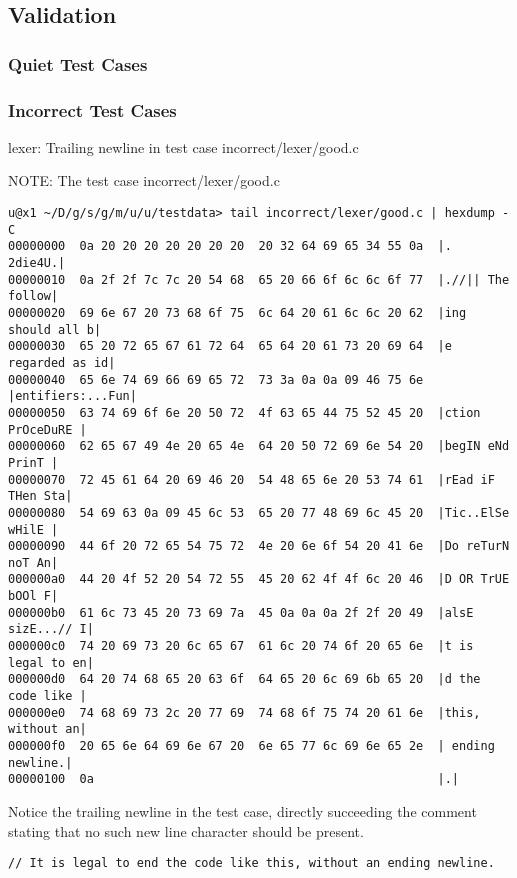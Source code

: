 \subsection{Validation}


\subsubsection{Quiet Test Cases}



\subsubsection{Incorrect Test Cases}

lexer: Trailing newline in test case incorrect/lexer/good.c


NOTE: The test case incorrect/lexer/good.c

\begin{verbatim}
u@x1 ~/D/g/s/g/m/u/u/testdata> tail incorrect/lexer/good.c | hexdump -C
00000000  0a 20 20 20 20 20 20 20  20 32 64 69 65 34 55 0a  |.        2die4U.|
00000010  0a 2f 2f 7c 7c 20 54 68  65 20 66 6f 6c 6c 6f 77  |.//|| The follow|
00000020  69 6e 67 20 73 68 6f 75  6c 64 20 61 6c 6c 20 62  |ing should all b|
00000030  65 20 72 65 67 61 72 64  65 64 20 61 73 20 69 64  |e regarded as id|
00000040  65 6e 74 69 66 69 65 72  73 3a 0a 0a 09 46 75 6e  |entifiers:...Fun|
00000050  63 74 69 6f 6e 20 50 72  4f 63 65 44 75 52 45 20  |ction PrOceDuRE |
00000060  62 65 67 49 4e 20 65 4e  64 20 50 72 69 6e 54 20  |begIN eNd PrinT |
00000070  72 45 61 64 20 69 46 20  54 48 65 6e 20 53 74 61  |rEad iF THen Sta|
00000080  54 69 63 0a 09 45 6c 53  65 20 77 48 69 6c 45 20  |Tic..ElSe wHilE |
00000090  44 6f 20 72 65 54 75 72  4e 20 6e 6f 54 20 41 6e  |Do reTurN noT An|
000000a0  44 20 4f 52 20 54 72 55  45 20 62 4f 4f 6c 20 46  |D OR TrUE bOOl F|
000000b0  61 6c 73 45 20 73 69 7a  45 0a 0a 0a 2f 2f 20 49  |alsE sizE...// I|
000000c0  74 20 69 73 20 6c 65 67  61 6c 20 74 6f 20 65 6e  |t is legal to en|
000000d0  64 20 74 68 65 20 63 6f  64 65 20 6c 69 6b 65 20  |d the code like |
000000e0  74 68 69 73 2c 20 77 69  74 68 6f 75 74 20 61 6e  |this, without an|
000000f0  20 65 6e 64 69 6e 67 20  6e 65 77 6c 69 6e 65 2e  | ending newline.|
00000100  0a                                                |.|
\end{verbatim}

Notice the trailing newline in the test case, directly succeeding the comment stating that no such new line character should be present.

\begin{verbatim}
// It is legal to end the code like this, without an ending newline.
\end{verbatim}


